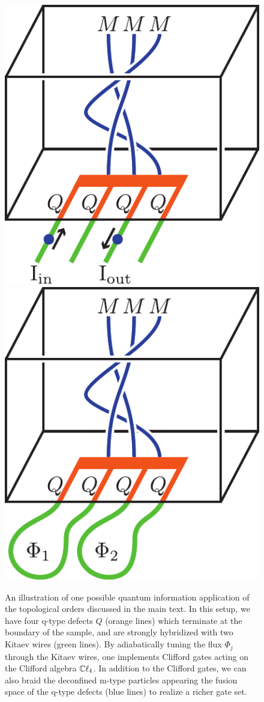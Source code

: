 \begin{figure}
\begin{center}
\includegraphics[scale=.8]{QCApplication.pdf}
\includegraphics[scale=.8]{QCApplication2.pdf}
\caption{\label{QCApplication}  
An illustration of one possible quantum information application of the topological orders discussed in the main text. 
In this setup, we have four q-type defects $Q$ (orange lines) which terminate at the boundary of the sample, and are strongly hybridized with two Kitaev wires (green lines). 
By adiabatically tuning the flux $\Phi_j$ through the Kitaev wires, one implements Clifford gates acting
on the Clifford algebra $\mathbb{C}\ell_4$. 
In addition to the Clifford gates, we can also braid the deconfined m-type particles appearing the fusion space of the q-type defects (blue lines) to realize a richer gate set. 
}
\end{center}
\end{figure}

